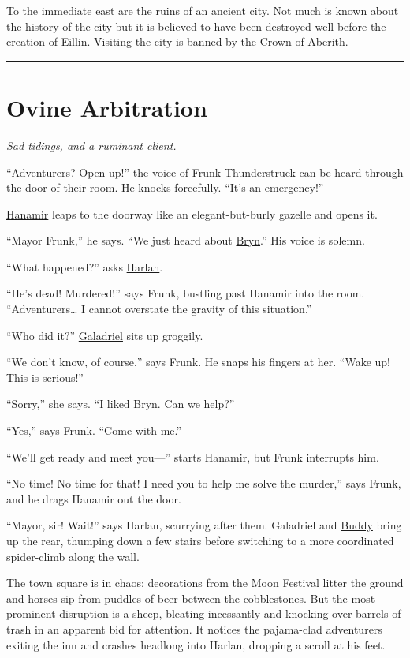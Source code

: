 \documentclass[smalldemyvopaper,11pt,twoside,onecolumn,openright,extrafontsizes]{memoir}
\newcommand{\chapdesc}[1]{
    \begin{flushright}
    \emph{{#1}}
    \end{flushright}
    \vspace{26pt}
}
\newlength\drop
\begin{document}
To the immediate east are the ruins of an ancient city. Not much is
known about the history of the city but it is believed to have been
destroyed well before the creation of Eillin. Visiting the city is
banned by the Crown of Aberith.

\begin{center}\rule{0.5\linewidth}{\linethickness}\end{center}


\chapter{Ovine Arbitration}
\chapdesc{Sad tidings, and a ruminant client.}

``Adventurers? Open up!'' the voice of \href{/characters/frunk/}{Frunk}
Thunderstruck can be heard through the door of their room. He knocks
forcefully. ``It's an emergency!''

\href{/characters/hanamir/}{Hanamir} leaps to the doorway like an
elegant-but-burly gazelle and opens it.

``Mayor Frunk,'' he says. ``We just heard about
\href{/characters/bryn/}{Bryn}.'' His voice is solemn.

``What happened?'' asks \href{/characters/harlan/}{Harlan}.

``He's dead! Murdered!'' says Frunk, bustling past Hanamir into the
room. ``Adventurers\ldots{} I cannot overstate the gravity of this
situation.''

``Who did it?'' \href{/characters/galadriel/}{Galadriel} sits up
groggily.

``We don't know, of course,'' says Frunk. He snaps his fingers at her.
``Wake up! This is serious!''

``Sorry,'' she says. ``I liked Bryn. Can we help?''

``Yes,'' says Frunk. ``Come with me.''

``We'll get ready and meet you---'' starts Hanamir, but Frunk interrupts
him.

``No time! No time for that! I need you to help me solve the murder,''
says Frunk, and he drags Hanamir out the door.

``Mayor, sir! Wait!'' says Harlan, scurrying after them. Galadriel and
\href{/characters/buddy/}{Buddy} bring up the rear, thumping down a few
stairs before switching to a more coordinated spider-climb along the
wall.

The town square is in chaos: decorations from the Moon Festival litter
the ground and horses sip from puddles of beer between the cobblestones.
But the most prominent disruption is a sheep, bleating incessantly and
knocking over barrels of trash in an apparent bid for attention. It
notices the pajama-clad adventurers exiting the inn and crashes headlong
into Harlan, dropping a scroll at his feet.
\end{document}
